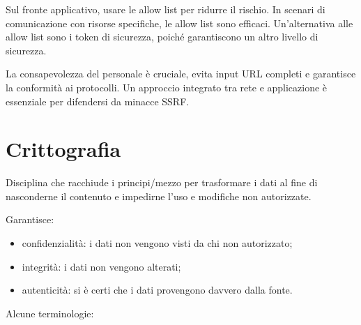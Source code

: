 \documentclass[
]{article}
\providecommand{\tightlist}{%
  \setlength{\itemsep}{0pt}\setlength{\parskip}{0pt}}
\begin{document}
{Sul fronte applicativo, usare le allow list per ridurre il rischio. In
scenari di comunicazione con risorse specifiche, le allow list sono
efficaci. Un'alternativa alle allow list sono i token di sicurezza,
poiché garantiscono un altro livello di sicurezza. }

{La consapevolezza del personale è cruciale, evita input URL completi e
garantisce la conformità ai protocolli. Un approccio integrato tra rete
e applicazione è essenziale per difendersi da minacce SSRF.}

{}

\section{\texorpdfstring{{Crittografia}}{Crittografia}}\label{h.okwuc08rzwsk}

{}

{Disciplina che racchiude i principi/mezzo per trasformare i dati al
fine di nasconderne il contenuto e impedirne l'uso e modifiche non
autorizzate.}

{}

{Garantisce:}

\begin{itemize}
\tightlist
\item
  {confidenzialità: i dati non vengono visti da chi non autorizzato;}
\item
  {integrità: i dati non vengono alterati;}
\item
  {autenticità: si è certi che i dati provengono davvero dalla fonte.}
\end{itemize}

{}

{Alcune terminologie:}
\end{document}
